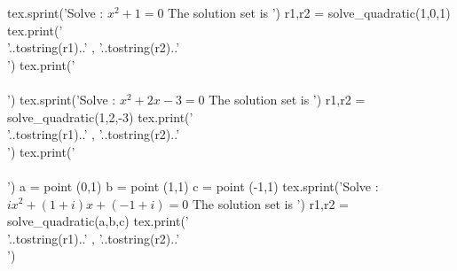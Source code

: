 \begin{tkzelements}
    tex.sprint('Solve : $x^2+1=0$ The solution set is  ')
    r1,r2 = solve_quadratic(1,0,1)
    tex.print('\\{'..tostring(r1)..' , '..tostring(r2)..'\\}')
    tex.print('\\\\')
    tex.sprint('Solve : $x^2+2x-3=0$ The solution set is  ')
    r1,r2 = solve_quadratic(1,2,-3)
    tex.print('\\{'..tostring(r1)..' , '..tostring(r2)..'\\}')
    tex.print('\\\\')
    a = point (0,1)
    b = point (1,1)
    c = point (-1,1)
    tex.sprint('Solve : $ix^2+(1+i)x+(-1+i)=0$ The solution set is  ')
    r1,r2 = solve_quadratic(a,b,c)
    tex.print('\\{'..tostring(r1)..' , '..tostring(r2)..'\\}')
\end{tkzelements}


\endinput

